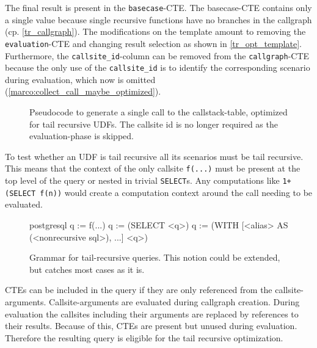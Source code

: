 The final result is present in the \texttt{basecase}-CTE. The basecase-CTE contains only a single value because single recursive functions have no branches in the callgraph (cp. \autoref{tr_callgraph}). The modifications on the template amount to removing the \texttt{evaluation}-CTE and changing result selection as shown in \autoref{tr_opt_template}. Furthermore, the \texttt{callsite\_id}-column can be removed from the \texttt{callgraph}-CTE because the only use of the \texttt{callsite\_id} is to identify the corresponding scenario during evaluation, which now is omitted (\autoref{marco:collect_call_maybe_optimized}).

\begin{figure}[h!]\centering\small
  \caption{Pseudocode to generate a single call to the callstack-table, optimized for tail recursive UDFs. The callsite id is no longer required as the evaluation-phase is skipped.}
  \label{marco:collect_call_maybe_optimized}
\end{figure}

To test whether an UDF is tail recursive all its scenarios must be tail recursive. This means that the context of the only callsite \texttt{f(...)} must be present at the top level of the query or nested in trivial \texttt{SELECT}s. Any computations like \texttt{1+(SELECT f(n))} would create a computation context around the call needing to be evaluated.

\begin{figure}[h!]
    \centering
\begin{cminted}{postgresql}
q := f(...)
q := (SELECT <q>)
q := (WITH [<alias> AS (<nonrecursive sql>), ...] <q>)
\end{cminted}
    \caption{Grammar for tail-recursive queries. This notion could be extended, but catches most cases as it is.}
    \label{tr_grammar}
\end{figure}

CTEs can be included in the query if they are only referenced from the callsite-arguments. Callsite-arguments are evaluated during callgraph creation. During evaluation the callsites including their arguments are replaced by references to their results. Because of this, CTEs are present but unused during evaluation. Therefore the resulting query is eligible for the tail recursive optimization.

